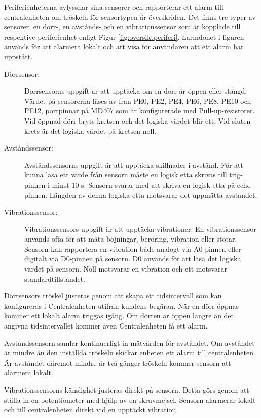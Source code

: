 \documentclass[a4paper]{article}
\begin{document}
Periferienheterna avlyssnar sina sensorer och rapporterar ett alarm till centralenheten om tröskeln för sensortypen är överskriden.
Det finns tre typer av sensorer, en dörr-, en avstånds- och en vibrationssensor som är kopplade till respektive periferienhet enligt Figur \ref{fig:oversiktperiferi}.
Larmdonet i figuren används för att alarmera lokalt och att visa för användaren att ett alarm har uppstått.

\begin{description}
    \item[Dörrsensor:] Dörrsensorns uppgift är att upptäcka om en dörr är öppen eller stängd.
    Värdet på sensorerna läses av från PE0, PE2, PE4, PE6, PE8, PE10 och PE12, portpinnar på MD407 som är konfigurerade med Pull-up-resistorer.
    Vid öppnad dörr bryts kretsen och det logiska värdet blir ett.
    Vid sluten krets är det logiska värdet på kretsen noll.

    \item[Avståndssensor:] Avståndssensorns uppgift är att upptäcka skillnader i avstånd.
    För att kunna läsa ett värde från sensorn måste en logisk etta skrivas till trig-pinnen i minst 10 \textmu s.
    Sensorn svarar med att skriva en logisk etta på echo-pinnen.
    Längden av denna logiska etta motsvarar det uppmätta avståndet.

    \item[Vibrationssensor:] Vibrationssensors uppgift är att upptäcka vibrationer.
    En vibrationssensor används ofta för att mäta böjningar, beröring, vibration eller stötar.
    Sensorn kan rapportera en vibration både analogt via A0-pinnen eller digitalt via D0-pinnen på sensorn.
    D0 används för att läsa det logiska värdet på sensorn.
    Noll motsvarar en vibration och ett motsvarar standardtillståndet.
\end{description}

Dörrsensors tröskel justeras genom att skapa ett tidsintervall som kan konfigureras i Centralenheten utifrån kundens begäran.
När en dörr öppnas kommer ett lokalt alarm triggas igång.
Om dörren är öppen längre än det angivna tidsintervallet kommer även Centralenheten få ett alarm.

Avståndssensorn samlar kontinuerligt in mätvärden för avståndet.
Om avståndet är mindre än den inställda tröskeln skickar enheten ett alarm till centralenheten.
Är avståndet däremot mindre är två gånger tröskeln kommer sensorn att alarmera lokalt.

Vibrationssensorns känslighet justeras direkt på sensorn.
Detta görs genom att ställa in en potentiometer med hjälp av en skruvmejsel.
Sensorn alarmerar lokalt och till centralenheten direkt vid en upptäckt vibration.
\end{document}
